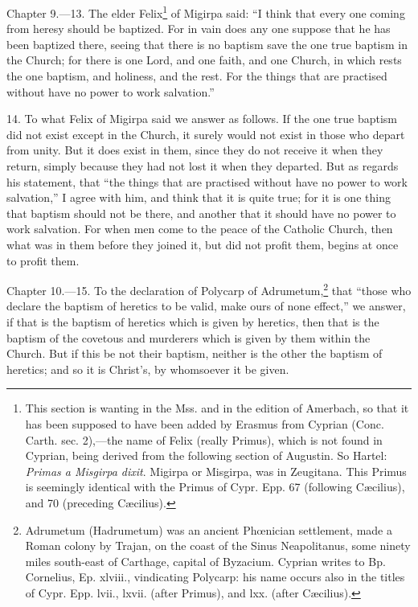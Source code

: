 
Chapter 9.—13. The elder Felix\footnote{\par  This section is wanting in the Mss. and in the edition of Amerbach, so that it has been supposed to have been added by Erasmus from Cyprian (Conc. Carth. sec. 2),—the name of Felix (really Primus), which is not found in Cyprian, being derived from the following section of Augustin. So Hartel: \emph{Primas a Misgirpa dixit}. Migirpa or Misgirpa, was in Zeugitana. This Primus is seemingly identical with the Primus of Cypr. Epp. 67 (following Cæcilius), and 70 (preceding Cæcilius).} of Migirpa said: ``I think that every one coming from heresy should be baptized. For in vain does any one suppose that he has been baptized there, seeing that there is no baptism save the one true baptism in the Church; for there is one Lord, and one faith, and one Church, in which rests the one baptism, and holiness, and the rest. For the things that are practised without have no power to work salvation.''

14. To what Felix of Migirpa said we answer as follows. If the one true baptism did not exist except in the Church, it surely would not exist in those who depart from unity. But it does exist in them, since they do not receive it when they return, simply because they had not lost it when they departed. But as regards his statement, that ``the things that are practised without have no power to work salvation,'' I agree with him, and think that it is quite true; for it is one thing that baptism should not be there, and another that it should have no power to work salvation. For when men come to the peace of the Catholic Church, then what was in them before they joined it, but did not profit them, begins at once to profit them.


Chapter 10.—15. To the declaration of Polycarp of Adrumetum,\footnote{\par  Adrumetum (Hadrumetum) was an ancient Phœnician settlement, made a Roman colony by Trajan, on the coast of the Sinus Neapolitanus, some ninety miles south-east of Carthage, capital of Byzacium. Cyprian writes to Bp. Cornelius, Ep. xlviii., vindicating Polycarp: his name occurs also in the titles of Cypr. Epp. lvii., lxvii. (after Primus), and lxx. (after Cæcilius).} that ``those who declare the baptism of heretics to be valid, make ours of none effect,'' we answer, if that is the baptism of heretics which is given by heretics, then that is the baptism of the covetous and murderers which is given by them within the Church. But if this be not their baptism, neither is the other the baptism of heretics; and so it is Christ’s, by whomsoever it be given.

